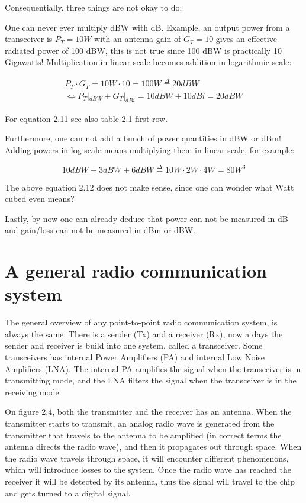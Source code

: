 Consequentially, three things are not okay to do:

One can never ever multiply dBW with dB. Example, an output power from a transceiver is $P_T = 10W$ with an antenna gain of $G_T = 10$ gives an effective radiated power of 100 dBW, this is not true since 100 dBW is practically 10 Gigawatts! Multiplication in linear scale becomes addition in logarithmic scale: 

\begin{equation}
\begin{split}
    P_T \cdot G_T = 10W \cdot 10 = 100W \overset{\Delta}{=} 20dBW\\
    \Leftrightarrow  P_T|_{dBW} + G_T|_{dBi} = 10dBW + 10dBi = 20dBW  
\end{split}
\end{equation}

For equation 2.11 see also table 2.1 first row. 

Furthermore, one can not add a bunch of power quantities in dBW or dBm! Adding powers in log scale means multiplying them in linear scale, for example:  

\begin{equation}
    10dBW + 3dBW + 6dBW \overset{\Delta}{=} 10W \cdot 2W \cdot 4W = 80W^3
\end{equation}

The above equation 2.12 does not make sense, since one can wonder what Watt cubed even means?

Lastly, by now one can already deduce that power can not be measured in dB and gain/loss can not be measured in dBm or dBW. 

\section{A general radio communication system}
The general overview of any point-to-point radio communication system, is always the same. There is a sender (Tx) and a receiver (Rx), now a days the sender and receiver is build into one system, called a transceiver. Some transceivers has internal Power Amplifiers (PA) and internal Low Noise Amplifiers (LNA). The internal PA amplifies the signal when the transceiver is in transmitting mode, and the LNA filters the signal when the transceiver is in the receiving mode.

On figure 2.4, both the transmitter and the receiver has an antenna. When the transmitter starts to transmit, an analog radio wave is generated from the transmitter that travels to the antenna to be amplified (in correct terms the antenna directs the radio wave), and then it propagates out through space. When the radio wave travels through space, it will encounter different phenomenons, which will introduce losses to the system. Once the radio wave has reached the receiver it will be detected by its antenna, thus the signal will travel to the chip and gets turned to a digital signal.

